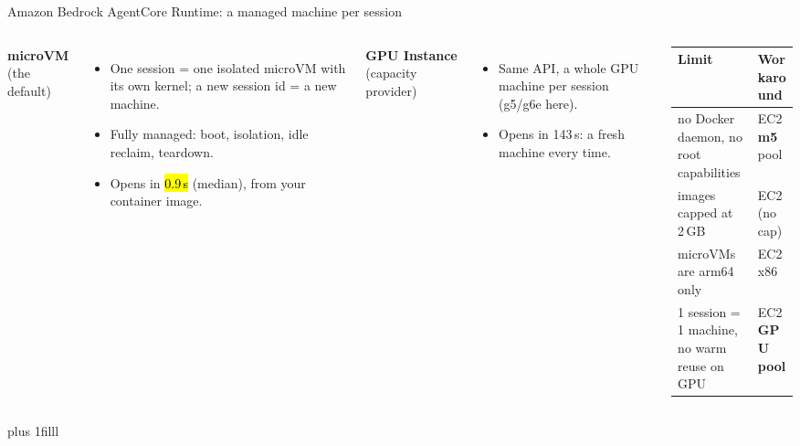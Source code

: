 \begin{frame}{Amazon Bedrock AgentCore Runtime: a managed machine per session}
\begin{columns}[T]
{\normalsize\textbf{\textcolor{cat2}{microVM}} \small(the default)}
\begin{itemize}\small\setlength{\itemsep}{1mm}
\item One session = one isolated microVM with its own kernel; a new session id = a new machine.
\item Fully managed: boot, isolation, idle reclaim, teardown.
\item Opens in \hl{0.9\,s} (median), from your container image.
\end{itemize}
\vspace{1mm}
{\normalsize\textbf{\textcolor{cat3}{GPU Instance}} \small(capacity provider)}
\begin{itemize}\small\setlength{\itemsep}{1mm}
\item Same API, a whole GPU machine per session (g5/g6e here).
\item Opens in 143\,s: a fresh machine every time.
\end{itemize}
\small\setlength{\tabcolsep}{3pt}\renewcommand{\arraystretch}{1.3}
\begin{tabularx}{\linewidth}{@{}Y P{0.34\linewidth}@{}}
\toprule
\textbf{Limit} & \textbf{Workaround}\\
\midrule
no Docker daemon, no root capabilities & EC2 \textcolor{cat1}{\textbf{m5}} pool\\
images capped at 2\,GB & EC2 (no cap)\\
microVMs are arm64 only & EC2 x86\\
1 session = 1 machine, no warm reuse on GPU & EC2 \textcolor{cat1}{\textbf{GPU pool}}\\
\bottomrule
\end{tabularx}
\end{columns}
\par\vskip 0pt plus 1filll
\end{frame}

